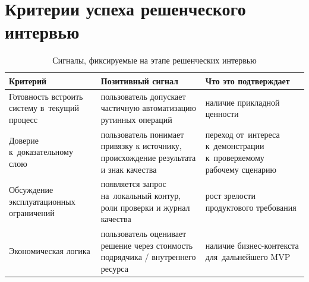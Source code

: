 \section*{Критерии успеха решенческого интервью}

\begin{table}[H]
  \caption{Сигналы, фиксируемые на этапе решенческих интервью}
  \label{tab:solution-signals}
  \centering
  \begin{tabular}{|P{5cm}|P{3.5cm}|P{4.5cm}|}
  \hline
  \textbf{Критерий} & \textbf{Позитивный сигнал} & \textbf{Что это подтверждает} \\
  \hline
  Готовность встроить систему в~текущий процесс
    & пользователь допускает частичную автоматизацию рутинных операций
    & наличие прикладной ценности \\
  \hline
  Доверие к~доказательному слою
    & пользователь понимает привязку к источнику, происхождение результата и знак качества
    & переход от~интереса к~демонстрации к~проверяемому рабочему сценарию \\
  \hline
  Обсуждение эксплуатационных ограничений
    & появляется запрос на~локальный контур, роли проверки и журнал качества
    & рост зрелости продуктового требования \\
  \hline
  Экономическая логика
    & пользователь оценивает решение через стоимость подрядчика / внутреннего ресурса
    & наличие бизнес-контекста для~дальнейшего MVP \\
  \hline
  \end{tabular}
\end{table}
